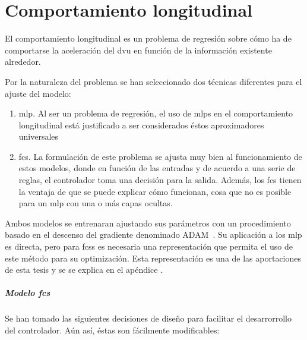 \chapter{Comportamiento longitudinal}
\label{ch:longitudinal-model}

El comportamiento longitudinal es un problema de regresión sobre cómo ha de comportarse la aceleración del \ac{dvu} en función de la información existente alrededor.

Por la naturaleza del problema se han seleccionado dos técnicas diferentes para el ajuste del modelo:

\begin{enumerate}
	\item \ac{mlp}. Al ser un problema de regresión, el uso de \acp{mlp} en el comportamiento longitudinal está justificado a ser considerados éstos aproximadores universales~\cite{hornik1991approximation}
	\item \ac{fcs}. La formulación de este problema se ajusta muy bien al funcionamiento de estos modelos, donde en función de las entradas y de acuerdo a una serie de reglas, el controlador toma una decisión para la salida. Además, los \ac{fcs} tienen la ventaja de que se puede explicar cómo funcionan, cosa que no es posible para un \ac{mlp} con una o más capas ocultas.
\end{enumerate}

Ambos modelos se entrenaran ajustando sus parámetros con un procedimiento basado en el descenso del gradiente denominado ADAM~\cite{kingma2014adam}. Su aplicación a los \ac{mlp} es directa, pero para \acp{fcs} es necesaria una representación que permita el uso de este método para su optimización. Esta representación es una de las aportaciones de esta tesis y se se explica en el apéndice .

\paragraph{Modelo \ac{fcs}}

Se han tomado las siguientes decisiones de diseño para facilitar el desarrorrollo del controlador. Aún así, éstas son fácilmente modificables:

